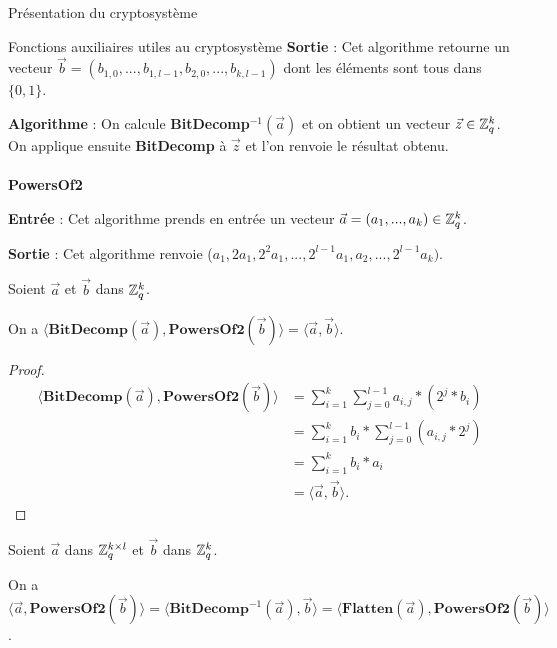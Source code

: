 \begin{section}{Présentation du cryptosystème}
\begin{subsection}{Fonctions auxiliaires utiles au cryptosystème}
	\textbf{Sortie} : Cet algorithme retourne un vecteur $\vec{b} = (b_{1,0}, ..., b_{1,l-1}, b_{2,0}, ..., b_{k,l-1})$ dont les éléments sont tous dans $\{ 0,1\} $.

	\textbf{Algorithme} : On calcule \textbf{BitDecomp}$^{-1}(\vec{a})$ et on obtient un vecteur $\vec{z} \in \mathbb{Z}_q^{k}$. On applique ensuite \textbf{BitDecomp} à $\vec{z}$ et l'on renvoie le résultat obtenu.
	
	\paragraph{}
	\textbf{PowersOf2}
	\flushleft

	\textbf{Entrée} : Cet algorithme prends en entrée un vecteur $\vec{a} = (a_1, ..., a_k) \in \mathbb{Z}_q^{k}$.

	\textbf{Sortie} : Cet algorithme renvoie ($a_1, 2 a_1, 2^{2} a_1, ..., 2^{l-1} a_1, a_2, ..., 2^{l-1} a_k)$.
	
	\begin{prop}
	Soient $\vec{a}$ et $\vec{b}$ dans $\mathbb{Z}_q^{k}$.

	On a $\langle \textbf{BitDecomp}(\vec{a}), \textbf{PowersOf2}(\vec{b}) \rangle = \langle\vec{a},\vec{b} \rangle$.
	\end{prop}

	\begin{proof}
	\begin{align*}
	\langle \textbf{BitDecomp}(\vec{a}), \textbf{PowersOf2}(\vec{b}) \rangle &= \sum\limits_{i=1}^{k} \sum\limits_{j=0}^{l-1} a_{i,j} * (2^{j} * b_i) \\
	&= \sum\limits_{i=1}^{k} b_i * \sum\limits_{j=0}^{l-1} (a_{i,j} * 2^{j}) \\
	&= \sum\limits_{i=1}^{k} b_i * a_i \\
	&= \langle\vec{a},\vec{b} \rangle.
	\end{align*}
	\end{proof}
	
	\begin{prop}
	Soient $\vec{a}$ dans $\mathbb{Z}_q^{k \times l}$ et $\vec{b}$ dans $\mathbb{Z}_q^{k}$.

	On a $\langle \vec{a}, \textbf{PowersOf2}(\vec{b}) \rangle = \langle \textbf{BitDecomp}^{-1}(\vec{a}), \vec{b}\rangle = \langle \textbf{Flatten}(\vec{a}),\textbf{PowersOf2}(\vec{b}) \rangle$.
	\end{prop}


\end{subsection}
\end{section}
